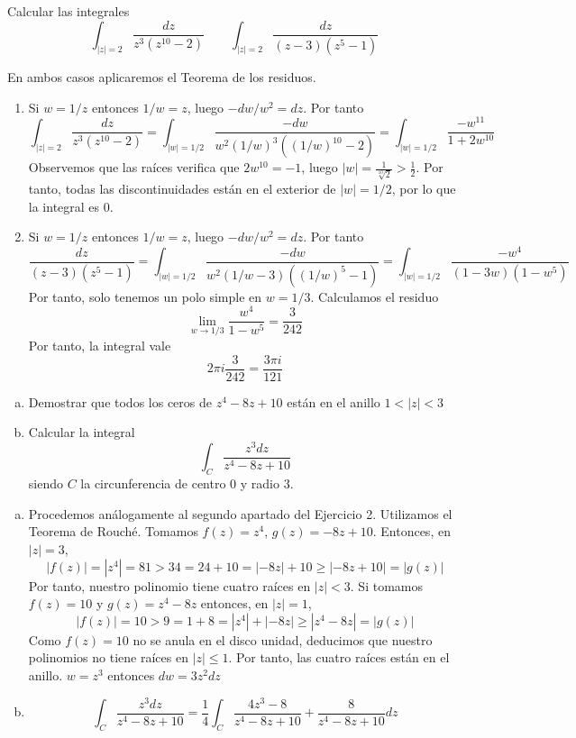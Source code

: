 \documentclass[twoside]{article}
\begin{document}
\newpage
\begin{ejercicio}{6}
Calcular las integrales
$$
\int_{|z|=2}\frac{dz}{z^3(z^{10}-2)} \qquad \int_{|z|=2}\frac{dz}{(z-3)(z^5-1)}
$$
\end{ejercicio}
\begin{solucion}
En ambos casos aplicaremos el Teorema de los residuos.
\begin{enumerate}
\item Si $w = 1/z$ entonces $1/w = z$, luego $-dw/w^2 = dz$. Por tanto 
$$
\int_{|z|=2}\frac{dz}{z^3(z^{10}-2)}= \int_{|w|=1/2} \frac{-dw}{w^2 (1/w)^3((1/w)^{10}-2)} = \int_{|w|=1/2}\frac{-w^{11}}{1+2w^{10}}
$$
Observemos que las raíces verifica que $2w^10 = -1$, luego $|w| = \frac{1}{\sqrt[10]{2}} > \frac{1}{2}$. Por tanto, todas las discontinuidades están en el exterior de $|w|=1/2$, por lo que la integral es $0$.
\item Si $w = 1/z$ entonces $1/w = z$, luego $-dw/w^2 = dz$. Por tanto 
$$
\frac{dz}{(z-3)(z^5-1)}= \int_{|w|=1/2} \frac{-dw}{w^2 (1/w-3)((1/w)^{5}-1)} = \int_{|w|=1/2}\frac{-w^{4}}{(1-3w)(1-w^5)}
$$
Por tanto, solo tenemos un polo simple en $w=1/3$. Calculamos el residuo
$$
\lim_{w\to 1/3} \frac{w^4}{1-w^5} = \frac{3}{242}
$$
Por tanto, la integral vale
$$2\pi i \frac{3}{242} = \frac{3\pi i}{121}$$
\end{enumerate}
\end{solucion}
\newpage

\begin{ejercicio}{7}
\begin{enumerate}[(a)]
\item Demostrar que todos los ceros de $z^4-8z+10$ están en el anillo $1<|z|<3$
\item Calcular la integral $$\int_C \frac{z^3dz}{z^4-8z+10}$$
siendo $C$ la circunferencia de centro $0$ y radio $3$.
\end{enumerate}
\end{ejercicio}
\begin{solucion}
\begin{enumerate}[(a)]
\item Procedemos análogamente al segundo apartado del Ejercicio 2. Utilizamos el Teorema de Rouché. Tomamos $f(z)=z^4$, $g(z)=-8z+10$. Entonces, en $|z|=3$,
$$
|f(z)|=|z^4| = 81 > 34 = 24 + 10 = |-8z|+10 \geq |-8z+10| = |g(z)|
$$
Por tanto, nuestro polinomio tiene cuatro raíces en $|z|<3$. Si tomamos $f(z)=10$ y $g(z)=z^4-8z$ entonces, en $|z|=1$,
$$
|f(z)| = 10 > 9 = 1+8 = |z^4|+|-8z| \geq |z^4-8z| =|g(z)|
$$
Como $f(z)=10$ no se anula en el disco unidad, deducimos que nuestro polinomios no tiene raíces en $|z|\leq 1$. Por tanto, las cuatro raíces están en el anillo. $w=z^3$ entonces $dw = 3z^2dz$
\item 
$$
\int_C \frac{z^3dz}{z^4-8z+10} = \frac{1}{4} \int_C \frac{4z^3 -8 }{z^4-8z+10} + \frac{8 }{z^4-8z+10} dz
$$
\end{enumerate}
\end{solucion}
\newpage
\end{document}

